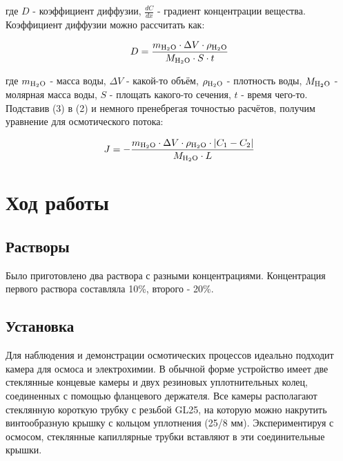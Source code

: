 \documentclass{article}
\begin{document}
            где $D$ - коэффициент диффузии, $\frac{dC}{dx}$ - градиент концентрации
            вещества. \\

            \hspace*{4mm}Коэффициент диффузии можно рассчитать как: 

            \begin{equation}
                D = \frac{m_{\ce{H2O}} \cdot \Delta{V} \cdot \rho_{\ce{H2O}}}{M_{\ce{H2O}} \cdot S \cdot t}
            \end{equation}

            где $m_{\ce{H2O}}$ - масса воды, $\Delta{V}$ - какой-то объём,
            $\rho_{\ce{H2O}}$ - плотность воды, $M_{\ce{H2O}}$ - молярная масса воды,
            $S$ - площать какого-то сечения, $t$ - время чего-то. \\

            \hspace*{4mm}Подставив (3) в (2) и немного пренебрегая точностью расчётов,
            получим уравнение для осмотического потока:

            \begin{equation}
                J = -\frac{m_{\ce{H2O}}\cdot\Delta{V}\cdot\rho_{\ce{H2O}}\cdot|C_1 - C_2|}{M_{\ce{H2O}}\cdot L}
            \end{equation}


    \newpage
    \section*{Ход работы}

        \subsection*{Растворы}
            \hspace*{4mm}Было приготовлено два раствора  с разными концентрациями.
            Концентрация первого раствора составляла 10\%, второго - 20\%.


        \subsection*{Установка}
            \hspace*{4mm}Для наблюдения и демонстрации осмотических процессов идеально
            подходит камера для осмоса и электрохимии. В обычной форме
            устройство имеет две стеклянные концевые камеры и двух резиновых
            уплотнительных колец, соединенных с помощью фланцевого держателя. Все
            камеры располагают стеклянную короткую трубку с резьбой GL25, на которую
            можно накрутить винтообразную крышку с кольцом уплотнения (25/8 мм).
            Экспериментируя с осмосом, стеклянные капиллярные трубки вставляют в эти
            соединительные крышки. \\
        
\end{document}
